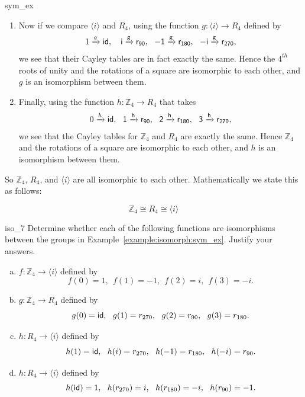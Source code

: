 \begin{example}{sym_ex}
\begin{enumerate}[(1)]
\item
Now if we compare $\langle i \rangle$ and $R_4$, using the function  $g: \langle i \rangle \longrightarrow R_4$  defined by
\begin{align*}
1 \xrightarrow{g} \sf{id}, ~~\
i \xrightarrow{g}  r_{90},~~
-1 \xrightarrow{g} r_{180},~~
 -i \xrightarrow{g} r_{270}, 
\end{align*}
we see that their Cayley tables are in fact exactly the same.  Hence the $4^{th}$ roots of unity and the rotations of a square are isomorphic to each other, and $g$ is an isomorphism between them.  

\item
Finally, using the  function
$h: {\mathbb Z_4} \longrightarrow R_4$  that takes
\begin{align*}
 0\xrightarrow{h} \sf{id},~~
    1 \xrightarrow{h} r_{90},~~
    2 \xrightarrow{h} r_{180},~~
    3 \xrightarrow{h} r_{270}, 
\end{align*}
we see that the Cayley tables for ${\mathbb Z_4}$ and $R_4$ are exactly the same.  Hence ${\mathbb Z_4}$ and the rotations of a square are isomorphic to each other, and $h$ is an isomorphism between them.
\end{enumerate}

\noindent
So ${\mathbb Z_4}$, $R_4$, and $\langle i \rangle$ are all isomorphic to each other. Mathematically we state this as follows:

\[ {\mathbb Z_4} \cong  R_4 \cong \langle i \rangle \]
 
 \end{example}
 
 

 \begin{exercise}{iso_7}
 Determine whether each of the following functions are isomorphisms between the groups in Example~\ref{example:isomorph:sym_ex}. Justify your answers. 
 \begin{enumerate}[(a)]
 \item
 $ f: {\mathbb Z_4}  \longrightarrow \langle i \rangle$ defined by 
\[  
f(0) = 1,~~
 f(1) = -1,~~
 f(2) = i,~~
 f(3) = -i.
\]
 
 \item
$ g: {\mathbb Z_4}  \longrightarrow R_4$ defined by 
\[ 
g(0) = {\sf{i}d},~~
 g(1) = r_{270},~~
 g(2) = r_{90} ,~~
 g(3) = r_{180}. 
 \]
 
 \item
 $ h: R_4 \longrightarrow \langle i \rangle$ defined by 
\[ 
 h(1) = {\sf{i}d},~~ 
h(i) = r_{270},~~
h(-1) = r_{180},~~
 h(-i) = r_{90}.
\]


 \item
 $ h: R_4 \longrightarrow \langle i \rangle$ defined by 
\[ 
 h({\sf{i}d}) = 1,~~ 
h(r_{270}) = i,~~
h(r_{180}) = -i,~~
 h(r_{90}) =-1.
\]

\end{enumerate}
 \end{exercise}

